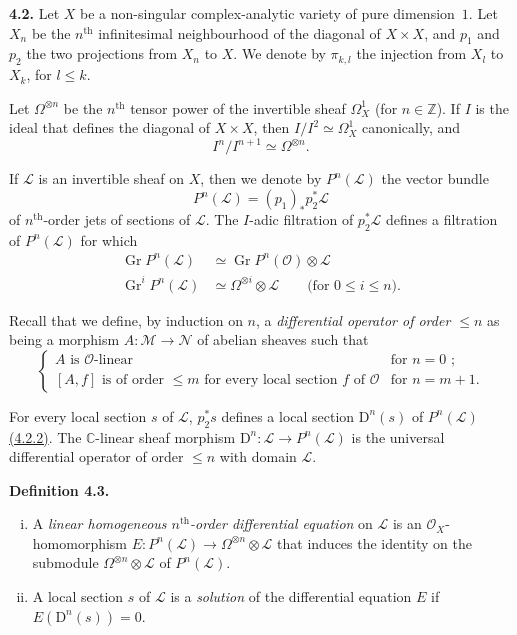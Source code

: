 \documentclass{report}
\newenvironment{rmenv}[1]
  {\phantomsection\par\medskip\noindent\textbf{#1.}\rmfamily}
  {\medskip}
\newcommand{\scr}[1]{{\mathscr{#1}}}
\renewcommand{\cal}[1]{{\mathcal{#1}}}
\newcommand{\CC}{\mathbb{C}}
\newcommand{\ZZ}{\mathbb{Z}}
\newcommand{\DD}{\mathrm{D}}
\renewcommand{\leq}{\leqslant}
\DeclareMathOperator{\Gr}{Gr}
\newcommand{\oldpage}[1]{\marginpar{\footnotesize$\Big\vert$ \textit{p.~#1}}}
\begin{document}
\begin{rmenv}{4.2}
\label{I.4.2}
  Let $X$ be a non-singular complex-analytic variety of pure dimension~$1$.
  Let $X_n$ be the $n^\mathrm{th}$ infinitesimal neighbourhood of the diagonal of $X\times X$, and $p_1$ and $p_2$ the two projections from $X_n$ to $X$.
  We denote by $\pi_{k,l}$ the injection from $X_l$ to
\oldpage{24}
  $X_k$, for $l\leq k$.

  Let $\Omega^{\otimes n}$ be the $n^\mathrm{th}$ tensor power of the invertible sheaf $\Omega_X^1$ (for $n\in\ZZ$).
  If $I$ is the ideal that defines the diagonal of $X\times X$, then $I/I^2\simeq\Omega_X^1$ canonically, and
  \[
  \label{I.4.2.1}
    I^n/I^{n+1} \simeq \Omega^{\otimes n}.
  \tag{4.2.1}
  \]

  If $\scr{L}$ is an invertible sheaf on $X$, then we denote by $P^n(\scr{L})$ the vector bundle
  \[
  \label{I.4.2.2}
    P^n(\scr{L}) = (p_1)_*p_2^*\scr{L}
  \tag{4.2.2}
  \]
  of $n^\mathrm{th}$-order jets of sections of $\scr{L}$.
  The $I$-adic filtration of $p_2^*\scr{L}$ defines a filtration of $P^n(\scr{L})$ for which
  \[
  \label{I.4.2.3}
    \begin{aligned}
      \Gr P^n(\scr{L}) &\simeq \Gr P^n(\cal{O})\otimes\scr{L}
    \\\Gr^i P^n(\scr{L}) &\simeq \Omega^{\otimes i}\otimes\scr{L} \qquad\mbox{(for $0\leq i\leq n$).}
    \end{aligned}
  \tag{4.2.3}
  \]

  Recall that we define, by induction on $n$, a \emph{differential operator of order $\leq n$} as being a morphism $A\colon\scr{M}\to\scr{N}$ of abelian sheaves such that
  \[
    \begin{cases}
      \mbox{$A$ is $\cal{O}$-linear} & \mbox{for $n=0$ ;}
    \\\mbox{$[A,f]$ is of order $\leq m$ for every local section $f$ of $\cal{O}$} & \mbox{for $n=m+1$.}
    \end{cases}
  \]

  For every local section $s$ of $\scr{L}$, $p_2^*s$ defines a local section $\DD^n(s)$ of $P^n(\scr{L})$ \hyperref[I.4.2.2]{(4.2.2)}.
  The $\CC$-linear sheaf morphism $\DD^n\colon\scr{L}\to P^n(\scr{L})$ is the universal differential operator of order $\leq n$ with domain $\scr{L}$.
\end{rmenv}

\begin{rmenv}{Definition 4.3}
\label{I.4.3}
  \begin{enumerate}[(i)]
    \item A \emph{linear homogeneous $n^\mathrm{th}$-order differential equation} on $\scr{L}$ is an $\cal{O}_X$-homomorphism $E\colon P^n(\scr{L})\to\Omega^{\otimes n}\otimes\scr{L}$ that induces the identity on the submodule $\Omega^{\otimes n}\otimes\scr{L}$ of $P^n(\scr{L})$.
    \item A local section $s$ of $\scr{L}$ is a \emph{solution} of the differential equation $E$ if $E(\DD^n(s))=0$.
  \end{enumerate}
\end{rmenv}
\end{document}
